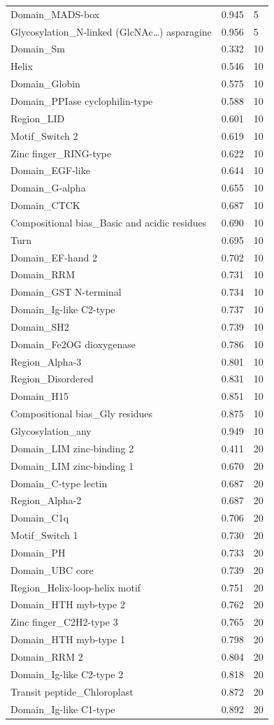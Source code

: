 \documentclass{article}
\begin{document}
\begin{longtable}{p{6.8cm}rp{2.0cm}}
Domain\_MADS-box & 0.945 & 5 \\
Glycosylation\_N-linked (GlcNAc\ldots{}) asparagine & 0.956 & 5 \\
Domain\_Sm & 0.332 & 10 \\
Helix & 0.546 & 10 \\
Domain\_Globin & 0.575 & 10 \\
Domain\_PPIase cyclophilin-type & 0.588 & 10 \\
Region\_LID & 0.601 & 10 \\
Motif\_Switch 2 & 0.619 & 10 \\
Zinc finger\_RING-type & 0.622 & 10 \\
Domain\_EGF-like & 0.644 & 10 \\
Domain\_G-alpha & 0.655 & 10 \\
Domain\_CTCK & 0.687 & 10 \\
Compositional bias\_Basic and acidic residues & 0.690 & 10 \\
Turn & 0.695 & 10 \\
Domain\_EF-hand 2 & 0.702 & 10 \\
Domain\_RRM & 0.731 & 10 \\
Domain\_GST N-terminal & 0.734 & 10 \\
Domain\_Ig-like C2-type & 0.737 & 10 \\
Domain\_SH2 & 0.739 & 10 \\
Domain\_Fe2OG dioxygenase & 0.786 & 10 \\
Region\_Alpha-3 & 0.801 & 10 \\
Region\_Disordered & 0.831 & 10 \\
Domain\_H15 & 0.851 & 10 \\
Compositional bias\_Gly residues & 0.875 & 10 \\
Glycosylation\_any & 0.949 & 10 \\
Domain\_LIM zinc-binding 2 & 0.411 & 20 \\
Domain\_LIM zinc-binding 1 & 0.670 & 20 \\
Domain\_C-type lectin & 0.687 & 20 \\
Region\_Alpha-2 & 0.687 & 20 \\
Domain\_C1q & 0.706 & 20 \\
Motif\_Switch 1 & 0.730 & 20 \\
Domain\_PH & 0.733 & 20 \\
Domain\_UBC core & 0.739 & 20 \\
Region\_Helix-loop-helix motif & 0.751 & 20 \\
Domain\_HTH myb-type 2 & 0.762 & 20 \\
Zinc finger\_C2H2-type 3 & 0.765 & 20 \\
Domain\_HTH myb-type 1 & 0.798 & 20 \\
Domain\_RRM 2 & 0.804 & 20 \\
Domain\_Ig-like C2-type 2 & 0.818 & 20 \\
Transit peptide\_Chloroplast & 0.872 & 20 \\
Domain\_Ig-like C1-type & 0.892 & 20 \\
\end{longtable}
\end{document}
